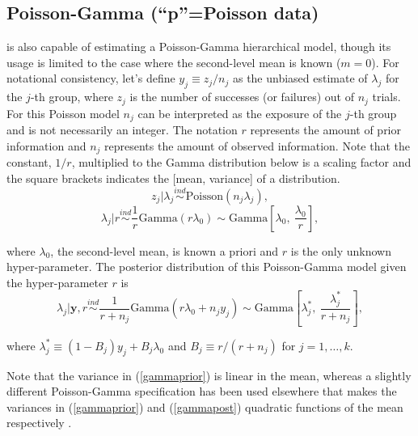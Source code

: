 \documentclass[article]{jss}
\begin{document}
\subsection[Poisson-Gamma]{Poisson-Gamma (``p''=Poisson data)}\label{poissonsubsec}
 is also capable of estimating a Poisson-Gamma hierarchical model, though its usage is limited to the case where the second-level mean is known ($m=0$). For notational consistency, let's define $y_{j}\equiv z_{j} / n_{j}$ as the unbiased estimate of $\lambda_{j}$ for the $j$-th group, where  $z_{j}$ is the number of successes (or failures) out of $n_{j}$ trials. For this Poisson model $n_{j}$ can be interpreted as the exposure of the $j$-th group and is not necessarily an integer. The notation $r$ represents the amount of prior information and $n_{j}$ represents the amount of observed information. Note that the constant, $1/r$, multiplied to the Gamma distribution below is a scaling factor and the square brackets indicates the [mean, variance] of a distribution. 
\begin{equation}
z_{j}\vert \lambda_{j} \stackrel{ind}{\sim}\textrm{Poisson}(n_{j}\lambda_{j}),
\end{equation}
\begin{equation}\label{gammaprior}
\lambda_{j}\vert r\stackrel{ind}{\sim}\frac{1}{r}\textrm{Gamma}(r\lambda_{0})\sim \textrm{Gamma} \left[\lambda_{0}, ~\frac{\lambda_{0}}{r} \right],
\end{equation}

where $\lambda_{0}$, the second-level mean, is known a priori and $r$ is the only unknown hyper-parameter. The posterior distribution of this Poisson-Gamma model given the hyper-parameter $r$ is
\begin{equation} \label{gammapost}
\lambda_{j}\vert \textbf{y}, r \stackrel{ind}{\sim}\frac{1}{r + n_{j}}\textrm{Gamma}(r\lambda_{0} + n_{j}y_{j})\sim\textrm{Gamma} \left[\lambda^{\ast}_{j},~\frac{\lambda^{\ast}_{j}}{r+n_{j}} \right],
\end{equation}

where $\lambda^{\ast}_{j} \equiv (1-B_{j})y_{j} + B_{j}\lambda_{0}$ and   $B_{j}\equiv r / (r+n_{j})$ for $j=1, \ldots, k$. 


Note that the variance in (\ref{gammaprior}) is linear in the mean, whereas a slightly different Poisson-Gamma specification has been used elsewhere \citep{1997} that makes the variances in (\ref{gammaprior}) and (\ref{gammapost}) quadratic functions of the mean respectively .
\end{document}
